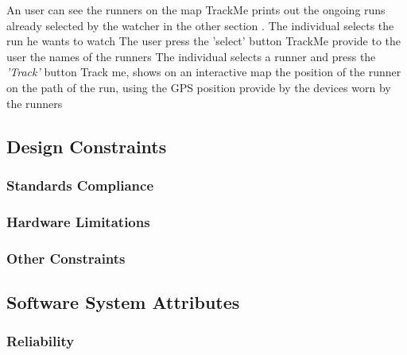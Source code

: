 \documentclass[a4paper]{article}
\begin{document}
        \begin{usecase}{An user can see the runners on the map}
              {TrackMe prints out the ongoing runs already selected by the watcher in the other section .}
              {The individual selects the run he wants to watch}
              {The user press the {'select'} button }
              {TrackMe provide to the user the names of the runners}
              {The individual selects a runner and press the \textit{'Track'} button}
              {Track me, shows on an interactive map the position of the runner on the path of the run, using the GPS position provide by the devices worn by the runners}
           
        \end{usecase}
        
    
    \subsection{Design Constraints}
    
        \subsubsection{Standards Compliance}
        
        \subsubsection{Hardware Limitations}
        
        \subsubsection{Other Constraints}
    
    \subsection{Software System Attributes}
        
        \subsubsection{Reliability}
        
\end{document}
